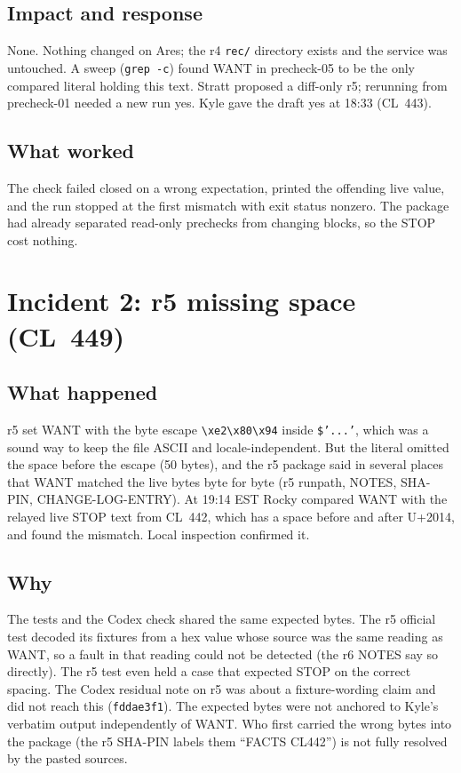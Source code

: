 \documentclass[10pt]{article}
\newcommand{\CL}[1]{CL~#1}
\newcommand{\dashesc}{\texttt{\textbackslash xe2\textbackslash x80\textbackslash x94}}
\begin{document}
\subsection{Impact and response}

None. Nothing changed on Ares; the r4 \texttt{rec/} directory exists and the service was untouched. A sweep (\texttt{grep -c}) found WANT in precheck-05 to be the only compared literal holding this text. Stratt proposed a diff-only r5; rerunning from precheck-01 needed a new run yes. Kyle gave the draft yes at 18:33 (\CL{443}).

\subsection{What worked}

The check failed closed on a wrong expectation, printed the offending live value, and the run stopped at the first mismatch with exit status nonzero. The package had already separated read-only prechecks from changing blocks, so the STOP cost nothing.

\section{Incident 2: r5 missing space (\CL{449})}

\subsection{What happened}

r5 set WANT with the byte escape \dashesc{} inside \texttt{\$'...'}, which was a sound way to keep the file ASCII and locale-independent. But the literal omitted the space before the escape (50 bytes), and the r5 package said in several places that WANT matched the live bytes byte for byte (r5 runpath, NOTES, SHA-PIN, CHANGE-LOG-ENTRY). At 19:14 EST Rocky compared WANT with the relayed live STOP text from \CL{442}, which has a space before and after U+2014, and found the mismatch. Local inspection confirmed it.

\subsection{Why}

The tests and the Codex check shared the same expected bytes. The r5 official test decoded its fixtures from a hex value whose source was the same reading as WANT, so a fault in that reading could not be detected (the r6 NOTES say so directly). The r5 test even held a case that expected STOP on the correct spacing. The Codex residual note on r5 was about a fixture-wording claim and did not reach this (\texttt{fddae3f1}). The expected bytes were not anchored to Kyle's verbatim output independently of WANT. Who first carried the wrong bytes into the package (the r5 SHA-PIN labels them ``FACTS CL442'') is not fully resolved by the pasted sources.
\end{document}
